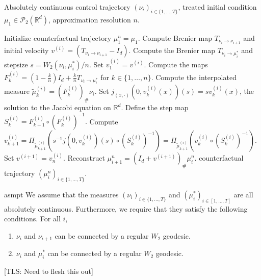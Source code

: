 \documentclass[11pt]{article}
\newcommand{\tls}[1]{{\color{cyan}[TLS: #1]}}
\begin{document}
\begin{algorithm}[H]
    \begin{algorithmic}[1]
        \caption{Population counterfactual trajectory reconstruction on $(\mathcal{P}_{2}(\mathbb{R}^d), W_2)$}
        \label{alg: W trajectory reconstruction}
        \Require Absolutely continuous control trajectory $(\nu_i)_{i \in \{1, \dots, T\}}$, treated initial condition $\mu_1 \in \mathcal{P}_2(\mathbb{R}^d)$, approximation resolution $n$. 
        
        \State Initialize counterfactual trajectory $\mu_1^n = \mu_1$. 
            \State Compute Brenier map $T_{\nu_i \rightarrow \nu_{i+1}}$ and initial velocity $v^{(i)} = (T_{\nu_i \rightarrow \nu_{i+1}} - I_d)$.
            \State Compute the Brenier map $T_{\nu_i \rightarrow \mu_i^*}$ and stepsize $s = W_2(\nu_i, \mu_i^*)/n.$
            \State Set $v^{(i)}_1 = v^{(i)}$.
            \State Compute the maps $F_k^{(i)} = (1 - \frac{k}{n})I_d + \frac{k}{n}T_{\nu_i \rightarrow \mu_i^*}$ for $k \in \{1, \dots, n\}$.
                \State Compute the interpolated measure $\tilde\mu_k^{(i)} = (F_{k}^{(i)})_\#\nu_i$.
                \State Set $j_{(x, \cdot)}(0, v_k^{(i)}(x))(s) = sv_k^{(i)}(x)$, the solution to the Jacobi equation on $\mathbb{R}^d$.
                \State Define the step map $S_k^{(i)} = F_{k+1}^{(i)} \circ (F_{k}^{(i)})^{-1}.$
                \State Compute $v_{k+1}^{(i)} = \Pi_{\tilde\mu_{k+1}^{(i)}}\left(s^{-1}j(0, v_k^{(i)})(s) \circ (S_k^{(i)})^{-1}\right) = \Pi_{\tilde\mu_{k + 1}^{(i)}}(v_k^{(i)} \circ (S_k^{(i)})^{-1})$. 
            \EndFor
            \State Set $v^{(i+1)} = v^{(i)}_n$.
            \State Reconstruct $\mu^n_{i+1} = (I_d + v^{(i+1)})_\#\mu_i^n$.
        \EndFor
    \State \Return counterfactual trajectory $(\mu_i^n)_{i \in \{1, \dots, T\}}$.
    \end{algorithmic}
\end{algorithm} 

\begin{restatable}{asmpt}{} \label{all necessary W assumptions}
    We assume that the measures $(\nu_i)_{i \in \{1, \dots, T\}}$ and $(\mu_i^*)_{i \in [1, \dots, T]}$ are all absolutely continuous. Furthermore, we require that they satisfy the following conditions. For all $i$,
    \begin{enumerate}
        \item $\nu_{i}$ and $\nu_{i+1}$ can be connected by a regular $W_2$ geodesic.
        \item $\nu_i$ and $\mu_i^*$ can be connected by a regular $W_2$ geodesic.
    \end{enumerate}
    \tls{Need to flesh this out}
\end{restatable}
\end{document}
